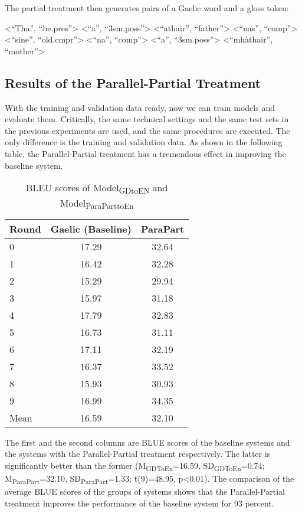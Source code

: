 \documentclass[final]{ua-thesis}
\numberwithin{equation}{section}
\begin{document}
The partial treatment then generates pairs of a Gaelic word and a gloss token: 
\begin{exe}
	\ex
	\begin{xlist}
		\ex <``Tha'', ``be.pres''>
		\ex <``a'', ``3sm.poss''>
		\ex <``athair'', ``father''>
		\ex <``nas'', ``comp''>
		\ex <``sine'', ``old.cmpr''>
		\ex <``na'', ``comp''>
		\ex <``a'', ``3sm.poss''>
		\ex <``mh\`athair'', ``mother''>
	\end{xlist}
\end{exe}

\subsection{Results of the Parallel-Partial Treatment}

With the training and validation data ready, now we can train models and evaluate them. Critically, the same technical settings and the same test sets in the previous experiments are used, and the same procedures are executed. The only difference is the training and validation data. As shown in the following table, the Parallel-Partial treatment has a tremendous effect in improving the baseline system.        

\begin{table}[ht]
\centering
\begin{tabular}{lcc}
  \hline
Round & Gaelic (Baseline) & ParaPart \\ 
  \hline
0 & 17.29 & 32.64 \\ 
  1 & 16.42 & 32.28 \\ 
  2 & 15.29 & 29.94 \\ 
  3 & 15.97 & 31.18 \\ 
  4 & 17.79 & 32.83 \\ 
  5 & 16.73 & 31.11 \\ 
  6 & 17.11 & 32.19 \\ 
  7 & 16.37 & 33.52 \\ 
  8 & 15.93 & 30.93 \\ 
  9 & 16.99 & 34.35 \\ 
   \hline
Mean & 16.59 & 32.10 \\ 
   \hline
\end{tabular}
\caption{BLEU scores of Model\textsubscript{GDtoEN} and Model\textsubscript{ParaParttoEn}} 
\label{Table:ParaPart}
\end{table}
The first and the second columns are BLUE scores of the baseline systems and the systems with the Parallel-Partial treatment respectively. The latter is significantly better than the former
(M\textsubscript{GDToEn}=16.59, SD\textsubscript{GDToEn}=0.74; M\textsubscript{ParaPart}=32.10, SD\textsubscript{ParaPart}=1.33; t(9)=48.95, p<0.01).
The comparison of the average BLUE scores of the groups of systems shows that the Parallel-Partial treatment improves the performance of the baseline system for 93 percent.
\end{document}

